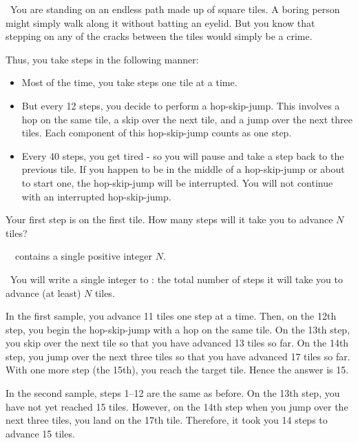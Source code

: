 

\Question\ You are standing on an endless path made up of square tiles. A boring person
might simply walk along it without batting an eyelid. But you know that stepping on any of
the cracks between the tiles would simply be a crime.

Thus, you take steps in the following manner:
\begin{itemize}
  \item Most of the time, you take steps one tile at a time.
  \item But every 12 steps, you decide to perform a hop-skip-jump. This involves a hop on
    the same tile, a skip over the next tile, and a jump over the next three tiles. Each
    component of this hop-skip-jump counts as one step.
  \item Every 40 steps, you get tired - so you will pause and take a step back to the
    previous tile. If you happen to be in the middle of a hop-skip-jump or about to start
    one, the hop-skip-jump will be interrupted. You will not continue with an interrupted
    hop-skip-jump.
\end{itemize}

Your first step is on the first tile. How many steps will it take you to advance $N$
tiles?

\Input\ \IN\ contains a single positive integer $N$.

\Output\ You will write a single integer to \OUT: the total number of steps it will take
you to advance (at least) $N$ tiles.

\Sample


\Explanation In the first sample, you advance 11 tiles one step at a time. Then, on the
12th step, you begin the hop-skip-jump with a hop on the same tile. On the 13th step, you
skip over the next tile so that you have advanced 13 tiles so far. On the 14th step, you
jump over the next three tiles so that you have advanced 17 tiles so far. With one more
step (the 15th), you reach the target tile. Hence the answer is 15.

In the second sample, steps 1--12 are the same as before. On the 13th step, you have not
yet reached 15 tiles. However, on the 14th step when you jump over the next three tiles,
you land on the 17th tile. Therefore, it took you 14 steps to advance 15 tiles.

